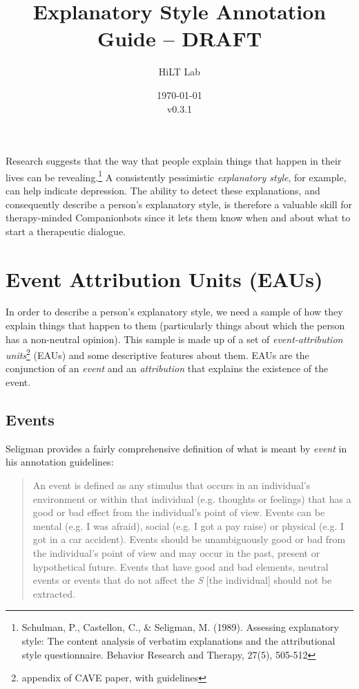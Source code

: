 \documentclass[a4paper,12pt]{article}
\begin{document}
\title{Explanatory Style Annotation Guide -- DRAFT}
\author{HiLT Lab}
\date{\today\\v0.3.1}
\maketitle

\tableofcontents
\break

Research suggests that the way that people explain things that happen in their lives can be revealing.\footnote{\label{seligman89}Schulman, P., Castellon, C., \& Seligman, M. (1989). Assessing explanatory style: The content analysis of verbatim explanations and the attributional style questionnaire. Behavior Research and Therapy, 27(5), 505-512} %
A consistently pessimistic \emph{explanatory style}, for example, can help indicate depression.
The ability to detect these explanations, and consequently describe a person's explanatory style, is therefore a valuable skill for therapy-minded Companionbots since it lets them know when and about what to start a therapeutic dialogue.

\section{Event Attribution Units (EAUs)}
In order to describe a person's explanatory style, we need a sample of how they explain things that happen to them (particularly things about which the person has a non-neutral opinion). %
This sample is made up of a set of \emph{event-attribution units}\footnote{\label{CAVE}appendix of CAVE paper, with guidelines} (EAUs) and some descriptive features about them. %
EAUs are the conjunction of an \emph{event} and an \emph{attribution} that explains the existence of the event.
 

\subsection{Events}

Seligman provides a fairly comprehensive definition of what is meant by \emph{event} in his annotation guidelines: %

\begin{quote}
    An event is defined as any stimulus that occurs in an individual's environment or within that individual (e.g. thoughts or feelings) that has a good or bad effect from the individual's point of view.
    Events can be mental (e.g. I was afraid), social (e.g. I got a pay raise) or physical (e.g. I got in a car accident).
    Events should be unambiguously good or bad from the individual's point of view and may occur in the past, present or hypothetical future.
    Events that have good and bad elements, neutral events or events that do not affect the \emph{S} [the individual] should not be extracted.
\end{quote}
\end{document}
